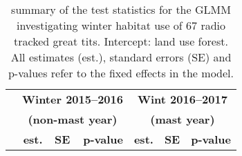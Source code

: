 \documentclass[10pt, twoside]{book} %
\begin{document}
	\begin{landscape}
		\begin{table}
			\begin{center}
				\begin{footnotesize}
					\caption{summary of the test statistics for the GLMM investigating winter habitat use of 67 radio tracked great tits. Intercept: land use forest. All estimates (est.), standard errors (SE) and p-values refer to the fixed effects in the model.}  \label{tab3-1}
					
					\begingroup
					\setlength{\tabcolsep}{8pt} %
					\renewcommand{\arraystretch}{1.5} %
					\begin{tabular}{l r r r r r r}
						
						\toprule
						& \multicolumn{3}{c}{\textbf{Winter 2015--2016}} & \multicolumn{3}{c}{\textbf{Wint 2016--2017}} \\
						& \multicolumn{3}{c}{\textbf{(non-mast year)}} & \multicolumn{3}{c}{\textbf{(mast year)}}\\
						\cmidrule(r){2-4}
						\cmidrule(r){5-7}
						& \textbf{est.} & \textbf{SE} & \textbf{p-value} & \textbf{est.} & \textbf{SE} & \textbf{p-value}\\
						\cmidrule(r){2-4}
						\cmidrule(r){5-7}
						

\end{tabular}
\end{footnotesize}
\end{center}
\end{table}
\end{landscape}
\end{document}
